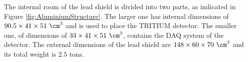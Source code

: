 The internal room of the lead shield is divided into two parts, as indicated in Figure \ref{fig:AluminiumStructure}. The larger one has internal dimensions of $90.5 \times 41 \times 51~\cm^3$ and is used to place the TRITIUM detector. The smaller one, of dimensions of $33 \times 41 \times 51~\cm^3$, contains the DAQ system of the detector. The external dimensions of the lead shield are $148 \times 60 \times 70~\cm^3$ and its total weight is $2.5$ tons.